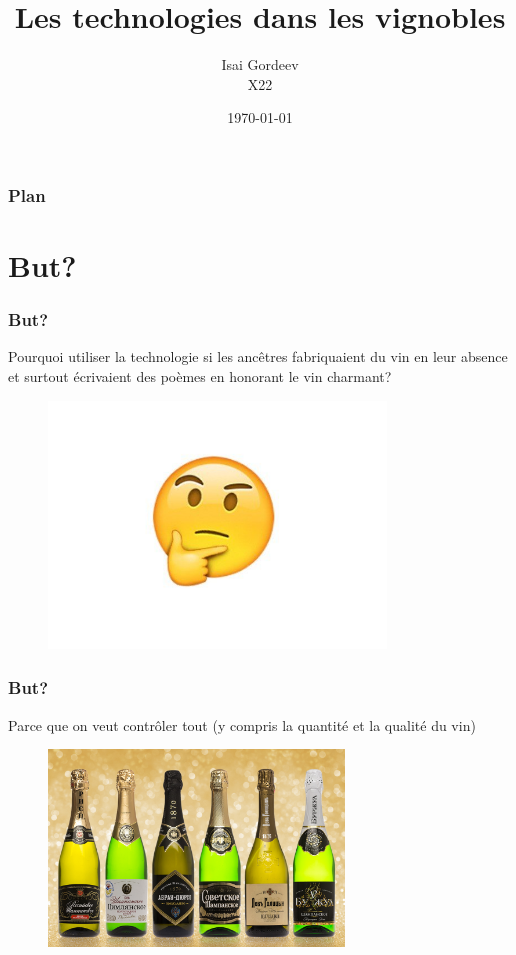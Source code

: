 \documentclass{beamer}
\title[Les technologies dans les vignobles (FLE)]{Les technologies dans les vignobles}
\author[Isai Gordeev]{Isai Gordeev\\X22}
\institute[]{École Polytechnique\\ Palaiseau}
\date{\today}
\begin{document}
	
	\begin{frame}
		\titlepage
	\end{frame}
	
	\begin{frame}
		\frametitle{Plan}
			\tableofcontents
	
	\end{frame}


	\section{But?}
	
	
	\begin{frame}
		\frametitle{But?}
		\begin{center}
Pourquoi utiliser la technologie si les ancêtres fabriquaient du vin en leur absence et surtout écrivaient des poèmes en honorant le vin charmant?
		\end{center}
	
		\begin{figure}
		\includegraphics[width=0.8\textwidth]{1}
		\label{fig:example}
		\end{figure}
		
	\end{frame}


	\begin{frame}
	\frametitle{But?}
	\begin{center}
		Parce que on veut contrôler tout (y compris la quantité et la qualité du vin)
	\end{center}
	
	\begin{figure}
		\includegraphics[width=0.7\textwidth]{cringevin}
		\label{fig:example}
	\end{figure}
	
\end{frame}
\end{document}
